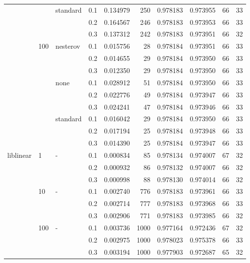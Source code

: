 \begin{table}[h!]
\begin{tabular}{llllrrrrrr}
          &     & standard & 0.1 &  0.134979 &     250 &  0.978183 &  0.973955 &          66 &        33 \\
          &     &   & 0.2 &  0.164567 &     246 &  0.978183 &  0.973953 &          66 &        33 \\
          &     &   & 0.3 &  0.137312 &     242 &  0.978183 &  0.973951 &          66 &        32 \\
          & 100 & nesterov & 0.1 &  0.015756 &      28 &  0.978184 &  0.973951 &          66 &        33 \\
          &     &   & 0.2 &  0.014655 &      29 &  0.978184 &  0.973950 &          66 &        33 \\
          &     &   & 0.3 &  0.012350 &      29 &  0.978184 &  0.973950 &          66 &        33 \\
          &     & none & 0.1 &  0.028912 &      51 &  0.978184 &  0.973950 &          66 &        33 \\
          &     &   & 0.2 &  0.022776 &      49 &  0.978184 &  0.973947 &          66 &        33 \\
          &     &   & 0.3 &  0.024241 &      47 &  0.978184 &  0.973946 &          66 &        33 \\
          &     & standard & 0.1 &  0.016042 &      29 &  0.978184 &  0.973950 &          66 &        33 \\
          &     &   & 0.2 &  0.017194 &      25 &  0.978184 &  0.973948 &          66 &        33 \\
          &     &   & 0.3 &  0.014390 &      25 &  0.978184 &  0.973947 &          66 &        33 \\
liblinear & 1   & - & 0.1 &  0.000834 &      85 &  0.978134 &  0.974007 &          67 &        32 \\
          &     &   & 0.2 &  0.000932 &      86 &  0.978132 &  0.974007 &          66 &        32 \\
          &     &   & 0.3 &  0.000998 &      88 &  0.978130 &  0.974014 &          66 &        32 \\
          & 10  & - & 0.1 &  0.002740 &     776 &  0.978183 &  0.973961 &          66 &        33 \\
          &     &   & 0.2 &  0.002714 &     777 &  0.978183 &  0.973968 &          66 &        33 \\
          &     &   & 0.3 &  0.002906 &     771 &  0.978183 &  0.973985 &          66 &        32 \\
          & 100 & - & 0.1 &  0.003736 &    1000 &  0.977164 &  0.972436 &          67 &        32 \\
          &     &   & 0.2 &  0.002975 &    1000 &  0.978023 &  0.975378 &          66 &        33 \\
          &     &   & 0.3 &  0.003194 &    1000 &  0.977903 &  0.972687 &          65 &        32 \\
\bottomrule
\end{tabular}
\end{table}
